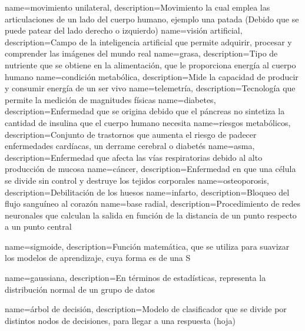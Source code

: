  {
 name={movimiento unilateral},
 description={Movimiento la cual emplea las articulaciones de un lado del cuerpo humano, ejemplo una patada (Debido que se puede patear del lado derecho o izquierdo)}
 }
 {
 name={visi\'on artificial},
 description={Campo de la  inteligencia artificial que permite adquirir, procesar y comprender las im\'agenes del mundo real}
 }
 {
 name={grasa},
 description={Tipo de nutriente que se obtiene en la alimentaci\'on, que le proporciona energ\'ia al cuerpo humano}
 }
 {
 name={condici\'on metab\'olica},
 description={Mide la capacidad de producir y consumir energ\'ia de un ser vivo}
 }
 {
 name={telemetr\'ia},
 description={Tecnolog\'ia que permite la medici\'on de magnitudes f\'isicas}
 }
 {
 name={diabetes},
 description={Enfermedad que se origina debido que el p\'ancreas no sintetiza la cantidad de insulina que el cuerpo humano necesita}
 }
 {
 name={riesgos metab\'olicos},
 description={Conjunto de trastornos que aumenta el riesgo de padecer enfermedades card\'iacas, un derrame cerebral o diabet\'es}
 }
 {
 name={asma},
 description={Enfermedad que afecta las v\'ias respiratorias debido al alto producci\'on de mucosa}
 }
 {
 name={c\'ancer},
 description={Enfermedad en que una c\'elula se divide sin control y destruye los tejidos corporales}
 }
 {
 name={osteoporosis},
 description={Debilitaci\'on de los huesos }
 }
 {
 name={infarto},
 description={Bloqueo del flujo sangu\'ineo al coraz\'on}
 }
 {
 name={base radial},
 description={Procedimiento de redes neuronales que calculan la salida en funci\'on de la distancia de un punto respecto a un punto central }
 }
 
 {
 name={sigmoide},
 description={Funci\'on matem\'atica, que se utiliza para suavizar los modelos de aprendizaje, cuya forma es de una S }
 }
 
 {
 name={gaussiana},
 description={En t\'erminos de estad\'isticas, representa la distribuci\'on normal de un grupo de datos}
 }
 
 {
 name={\'arbol de decisi\'on},
 description={Modelo de clasificador que se divide por distintos nodos de decisiones, para llegar a una respuesta (hoja)}
 }
 
